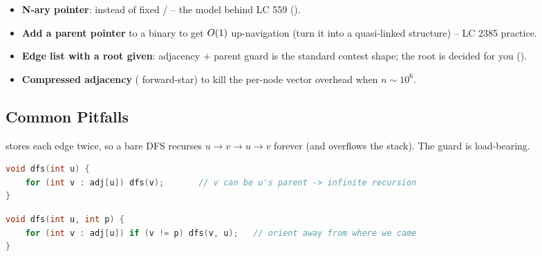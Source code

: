 \begin{itemize}[nosep]
  \item \textbf{N-ary pointer}:  instead of fixed
        / -- the model behind LC 559 (). \hfill{}
  \item \textbf{Add a parent pointer} to a binary  to get $O(1)$
        up-navigation (turn it into a quasi-linked structure) -- LC 2385 practice. \hfill{}
  \item \textbf{Edge list with a root given}: adjacency $+$ parent guard is the standard
        contest shape; the root is decided for you ().          \hfill{}
  \item \textbf{Compressed adjacency} ( forward-star) to kill
        the per-node vector overhead when $n \sim 10^{6}$.                       \hfill{}
\end{itemize}

\subsection{Common Pitfalls}\label{sec:c04-reps-pitfalls}

\begin{warningbox}
 stores each edge twice, so a bare DFS recurses $u \to v \to u \to v$ forever
(and overflows the stack). The guard  is load-bearing.
\end{warningbox}
\begin{lstlisting}[caption={\textcolor{warningred}{WRONG}: bounces back along the edge}, language=C++, basicstyle=\ttfamily\small]
void dfs(int u) {
    for (int v : adj[u]) dfs(v);       // v can be u's parent -> infinite recursion
}
\end{lstlisting}
\begin{lstlisting}[caption={\textcolor{successgreen}{RIGHT}: carry the parent, skip it}, language=C++, basicstyle=\ttfamily\small]
void dfs(int u, int p) {
    for (int v : adj[u]) if (v != p) dfs(v, u);   // orient away from where we came
}
\end{lstlisting}

